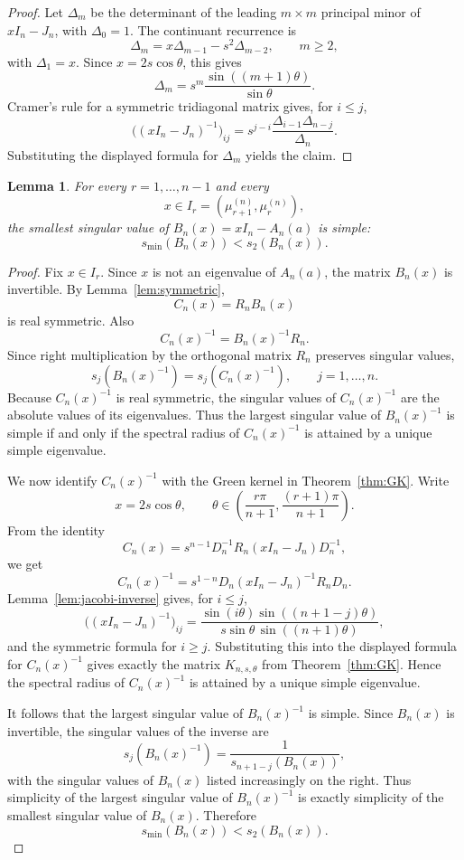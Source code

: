 \documentclass[11pt]{article}
\newtheorem{lemma}[theorem]{Lemma}
\begin{document}
\begin{proof}
Let $\Delta_m$ be the determinant of the leading $m\times m$ principal minor
of $xI_n-J_n$, with $\Delta_0=1$.  The continuant recurrence is
\[
\Delta_m=x\Delta_{m-1}-s^2\Delta_{m-2},
\qquad m\geq2,
\]
with $\Delta_1=x$.  Since $x=2s\cos\theta$, this gives
\[
\Delta_m=s^m\frac{\sin((m+1)\theta)}{\sin\theta}.
\]
Cramer's rule for a symmetric tridiagonal matrix gives, for $i\leq j$,
\[
\bigl((xI_n-J_n)^{-1}\bigr)_{ij}
=s^{j-i}\frac{\Delta_{i-1}\Delta_{n-j}}{\Delta_n}.
\]
Substituting the displayed formula for $\Delta_m$ yields the claim.
\end{proof}

\begin{lemma}\label{lem:green-simplicity}
For every $r=1,\ldots,n-1$ and every
\[
x\in I_r=(\mu_{r+1}^{(n)},\mu_r^{(n)}),
\]
the smallest singular value of $B_n(x)=xI_n-A_n(a)$ is simple:
\[
s_{\min}(B_n(x))<s_2(B_n(x)).
\]
\end{lemma}

\begin{proof}
Fix $x\in I_r$.  Since $x$ is not an eigenvalue of $A_n(a)$, the matrix
$B_n(x)$ is invertible.  By Lemma~\ref{lem:symmetric},
\[
C_n(x)=R_nB_n(x)
\]
is real symmetric.  Also
\[
C_n(x)^{-1}=B_n(x)^{-1}R_n.
\]
Since right multiplication by the orthogonal matrix $R_n$ preserves singular
values,
\[
s_j(B_n(x)^{-1})=s_j(C_n(x)^{-1}),
\qquad j=1,\ldots,n.
\]
Because $C_n(x)^{-1}$ is real symmetric, the singular values of
$C_n(x)^{-1}$ are the absolute values of its eigenvalues.  Thus the largest
singular value of $B_n(x)^{-1}$ is simple if and only if the spectral radius of
$C_n(x)^{-1}$ is attained by a unique simple eigenvalue.

We now identify $C_n(x)^{-1}$ with the Green kernel in
Theorem~\ref{thm:GK}.  Write
\[
x=2s\cos\theta,
\qquad
\theta\in\left(\frac{r\pi}{n+1},\frac{(r+1)\pi}{n+1}\right).
\]
From the identity
\[
C_n(x)
=s^{n-1}D_n^{-1}R_n(xI_n-J_n)D_n^{-1},
\]
we get
\[
C_n(x)^{-1}
=s^{1-n}D_n(xI_n-J_n)^{-1}R_nD_n.
\]
Lemma~\ref{lem:jacobi-inverse} gives, for
$i\leq j$,
\[
\bigl((xI_n-J_n)^{-1}\bigr)_{ij}
=
\frac{
 \sin(i\theta)\sin((n+1-j)\theta)
}{
 s\sin\theta\,\sin((n+1)\theta)
},
\]
and the symmetric formula for $i\geq j$.  Substituting this into the displayed
formula for $C_n(x)^{-1}$ gives exactly the matrix $K_{n,s,\theta}$ from
Theorem~\ref{thm:GK}.  Hence the spectral radius of $C_n(x)^{-1}$ is attained
by a unique simple eigenvalue.

It follows that the largest singular value of $B_n(x)^{-1}$ is simple.  Since
$B_n(x)$ is invertible, the singular values of the inverse are
\[
s_j(B_n(x)^{-1})=\frac{1}{s_{n+1-j}(B_n(x))},
\]
with the singular values of $B_n(x)$ listed increasingly on the right.  Thus
simplicity of the largest singular value of $B_n(x)^{-1}$ is exactly
simplicity of the smallest singular value of $B_n(x)$.  Therefore
\[
s_{\min}(B_n(x))<s_2(B_n(x)).
\]
\end{proof}
\end{document}
